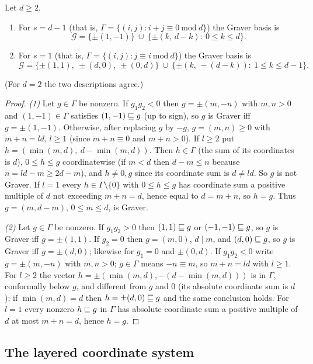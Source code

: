 \begin{lemma}[Graver vectors for $s=\pm1$]\label{lem:special-graver}
Let $d\ge2$.
\begin{enumerate}
\item For $s=d-1$ (that is, $\Gamma=\{(i,j):i+j\equiv0\ \mathrm{mod}\ d\}$) the Graver basis is
\[
  \mathcal G=\{\pm(1,-1)\}\ \cup\ \{\pm(k,\,d-k):\ 0\le k\le d\}.
\]
\item For $s=1$ (that is, $\Gamma=\{(i,j):j\equiv i\ \mathrm{mod}\ d\}$) the Graver basis is
\[
  \mathcal G=\{\pm(1,1),\ \pm(d,0),\ \pm(0,d)\}\ \cup\ \{\pm(k,\,-(d-k)):\ 1\le k\le d-1\}.
\]
\end{enumerate}
(For $d=2$ the two descriptions agree.)
\end{lemma}
\begin{proof}
\emph{(1)} Let $g\in\Gamma$ be nonzero. If $g_1g_2<0$ then $g=\pm(m,-n)$ with $m,n>0$ and $(1,-1)\in\Gamma$ satisfies $(1,-1)\sqsubseteq g$ (up to sign), so $g$ is Graver iff $g=\pm(1,-1)$. Otherwise, after replacing $g$ by $-g$, $g=(m,n)\ge0$ with $m+n=ld$, $l\ge1$ (since $m+n\equiv0$ and $m+n>0$). If $l\ge2$ put $h=(\min(m,d),\ d-\min(m,d))$. Then $h\in\Gamma$ (the sum of its coordinates is $d$), $0\le h\le g$ coordinatewise (if $m<d$ then $d-m\le n$ because $n=ld-m\ge2d-m$), and $h\ne0,g$ since its coordinate sum is $d\ne ld$. So $g$ is not Graver. If $l=1$ every $h\in\Gamma\setminus\{0\}$ with $0\le h\le g$ has coordinate sum a positive multiple of $d$ not exceeding $m+n=d$, hence equal to $d=m+n$, so $h=g$. Thus $g=(m,d-m)$, $0\le m\le d$, is Graver.

\emph{(2)} Let $g\in\Gamma$ be nonzero. If $g_1g_2>0$ then $(1,1)\sqsubseteq g$ or $(-1,-1)\sqsubseteq g$, so $g$ is Graver iff $g=\pm(1,1)$. If $g_2=0$ then $g=(m,0)$, $d\mid m$, and $(d,0)\sqsubseteq g$, so $g$ is Graver iff $g=\pm(d,0)$; likewise for $g_1=0$ and $\pm(0,d)$. If $g_1g_2<0$ write $g=\pm(m,-n)$ with $m,n>0$; $g\in\Gamma$ means $-n\equiv m$, so $m+n=ld$ with $l\ge1$. For $l\ge2$ the vector $h=\pm(\min(m,d),-(d-\min(m,d)))$ is in $\Gamma$, conformally below $g$, and different from $g$ and $0$ (its absolute coordinate sum is $d$); if $\min(m,d)=d$ then $h=\pm(d,0)\sqsubseteq g$ and the same conclusion holds. For $l=1$ every nonzero $h\sqsubseteq g$ in $\Gamma$ has absolute coordinate sum a positive multiple of $d$ at most $m+n=d$, hence $h=g$.
\end{proof}

\subsection{The layered coordinate system}

